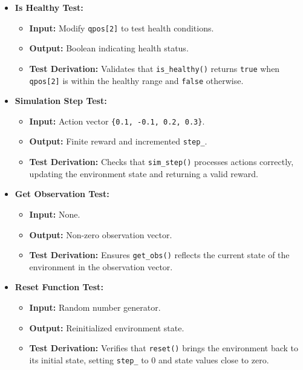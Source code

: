 \documentclass[12pt, titlepage]{article}
\begin{document}
\begin{itemize}
    \item \textbf{Is Healthy Test:}
    \begin{itemize}
        \item \textbf{Input:} Modify \texttt{qpos[2]} to test health conditions.
        \item \textbf{Output:} Boolean indicating health status.
        \item \textbf{Test Derivation:} Validates that \texttt{is\_healthy()} returns \texttt{true} when \texttt{qpos[2]} is within the healthy range and \texttt{false} otherwise.
    \end{itemize}

    \item \textbf{Simulation Step Test:}
    \begin{itemize}
        \item \textbf{Input:} Action vector \texttt{\{0.1, -0.1, 0.2, 0.3\}}.
        \item \textbf{Output:} Finite reward and incremented \texttt{step\_}.
        \item \textbf{Test Derivation:} Checks that \texttt{sim\_step()} processes actions correctly, updating the environment state and returning a valid reward.
    \end{itemize}

    \item \textbf{Get Observation Test:}
    \begin{itemize}
        \item \textbf{Input:} None.
        \item \textbf{Output:} Non-zero observation vector.
        \item \textbf{Test Derivation:} Ensures \texttt{get\_obs()} reflects the current state of the environment in the observation vector.
    \end{itemize}

    \item \textbf{Reset Function Test:}
    \begin{itemize}
        \item \textbf{Input:} Random number generator.
        \item \textbf{Output:} Reinitialized environment state.
        \item \textbf{Test Derivation:} Verifies that \texttt{reset()} brings the environment back to its initial state, setting \texttt{step\_} to 0 and state values close to zero.
    \end{itemize}
\end{itemize}
\end{document}
